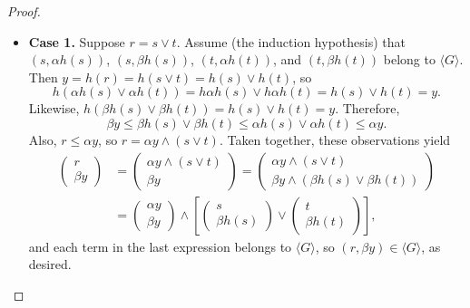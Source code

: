 \begin{proof}
\begin{itemize}
\item {\bf Case 1.} Suppose $r = s \vee t$. Assume (the induction hypothesis) that
$(s, \alpha {h(s)})$, $(s, \beta{h(s)})$, $(t, \alpha {h(t)})$, and 
$(t, \beta{h(t)})$ belong to $\langle G \rangle$. Then 
$y = h (r) = h(s\vee t) = h (s)\vee h(t)$, so 
\[
h(\alpha {h(s)} \vee \alpha {h(t)})= h\alpha h(s) \vee h\alpha h(t)=
h(s) \vee h(t) = y.
\]
Likewise, $h(\beta{h(s)} \vee \beta {h(t)})= h(s) \vee h(t) = y$.
Therefore, 
\[
\beta y \leqslant \beta h(s) \vee \beta h(t) \leqslant \alpha {h(s)} \vee \alpha {h(t)} \leqslant \alpha y.
\]
Also, $r \leqslant \alpha y$, so $r = \alpha y \wedge (s\vee t)$.  Taken together, these observations yield
\begin{align}
\left(\begin{array}{c} r \\ \beta y\end{array}\right) &= 
\left(\begin{array}{c} \alpha y \wedge (s\vee t) \\ \beta y\end{array}\right) = 
  \left(\begin{array}{c} \alpha y \wedge (s\vee t) \\ \beta y \wedge (\beta {h(s)} \vee \beta {h(t)}) \end{array}\right)\nonumber\\
  &= 
\left(\begin{array}{c} \alpha y\\ \beta y\end{array}\right) \wedge 
  \left[\left(\begin{array}{c}s \\ \beta {h(s)}\end{array}\right) \vee \left(\begin{array}{c}t \\ \beta {h(t)} \end{array}\right)\right], \nonumber
\end{align}
and each term in the last expression belongs to $\langle G \rangle$, so $(r, \beta y) \in \langle G \rangle$, as desired.


\end{itemize}
\end{proof}
